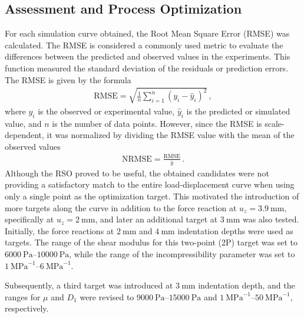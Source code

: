\subsection*{Assessment and Process Optimization}
For each simulation curve obtained, the Root Mean Square Error (RMSE) was calculated.
The RMSE is considered a commonly used metric to evaluate the differences between the predicted and 
observed values in the experiments. This function measured the standard deviation of the residuals 
or prediction errors. The RMSE is given by the formula 
\begin{align}
	\text{RMSE} = \sqrt{\frac{1}{n}\sum_{i=1}^{n}(y_i - \hat{y}_i)^2}\, ,
    \label{eq:rmse}
\end{align}
where $y_i$ is the observed or experimental value, $\hat{y}_i$ is the predicted or simulated value, and 
$n$ is the number of data points. However, since the RMSE is scale-dependent, it was normalized by dividing the
RMSE value with the mean of the observed values%
\begin{align}
	\text{NRMSE} = \frac{\text{RMSE}}{\bar{y}} \, .
    \label{eq:nrmse}
\end{align}
Although the RSO proved to be useful, the obtained candidates were not providing a satisfactory 
match to the entire load-displacement curve when using only a single point as the optimization target.
This motivated the introduction of more targets along the curve in addition to the force reaction at 
$u_z=\SI{3.9}{\milli\meter}$, specifically at $u_z=\SI{2}{\milli\meter}$, 
and later an additional target at $\SI{3}{\milli\meter}$ was also tested.\\

Initially, the force reactions at $\SI{2}{\milli\meter}$ and $\SI{4}{\milli\meter}$ indentation depths
were used as targets. The range of the shear modulus for this two-point (2P) target was set to
$\SIrange{6000}{10000}{\pascal}$, while the range of the incompressibility parameter was set to 
$\SIrange{1}{6}{\mega\pascal\tothe{-1}}$.

Subsequently, a third target was introduced at $\SI{3}{\milli\meter}$ indentation depth, and the ranges 
for $\mu$ and $D_1$ were revised to $\SIrange{9000}{15000}{\pascal}$ and $\SIrange{1}{50}{\mega\pascal\tothe{-1}}$, 
respectively.

